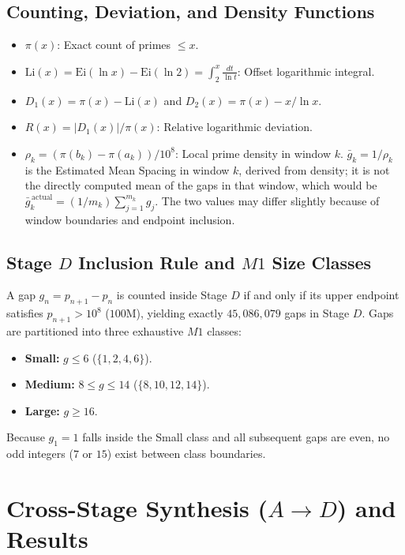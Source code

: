 \documentclass[12pt,a4paper]{article}
\begin{document}
\subsection{Counting, Deviation, and Density Functions}
\begin{itemize}
    \item $\pi(x)$: Exact count of primes $\leq x$.
    \item $\mathrm{Li}(x) = \mathrm{Ei}(\ln x) - \mathrm{Ei}(\ln 2) = \int_2^x \frac{dt}{\ln t}$: Offset logarithmic integral.
    \item $D_1(x) = \pi(x) - \mathrm{Li}(x)$ and $D_2(x) = \pi(x) - x/\ln x$.
    \item $R(x) = |D_1(x)| / \pi(x)$: Relative logarithmic deviation.
    \item $\rho_k = (\pi(b_k) - \pi(a_k)) / 10^8$: Local prime density in window $k$. $\bar{g}_k = 1/\rho_k$ is the Estimated Mean Spacing in window $k$, derived from density; it is not the directly computed mean of the gaps in that window, which would be $\bar{g}_k^{\,\mathrm{actual}} = (1/m_k)\sum_{j=1}^{m_k} g_j$. The two values may differ slightly because of window boundaries and endpoint inclusion.
\end{itemize}

\subsection{Stage $D$ Inclusion Rule and $M1$ Size Classes}
A gap $g_n = p_{n+1} - p_n$ is counted inside Stage $D$ if and only if its upper endpoint satisfies $p_{n+1} > 10^8$ ($100\text{M}$), yielding exactly $45,086,079$ gaps in Stage $D$. Gaps are partitioned into three exhaustive $M1$ classes:
\begin{itemize}
    \item \textbf{Small:} $g \leq 6$ ($\{1, 2, 4, 6\}$).
    \item \textbf{Medium:} $8 \leq g \leq 14$ ($\{8, 10, 12, 14\}$).
    \item \textbf{Large:} $g \geq 16$.
\end{itemize}
Because $g_1 = 1$ falls inside the Small class and all subsequent gaps are even, no odd integers ($7$ or $15$) exist between class boundaries.

\section{Cross-Stage Synthesis ($A \rightarrow D$) and Results}
\end{document}
